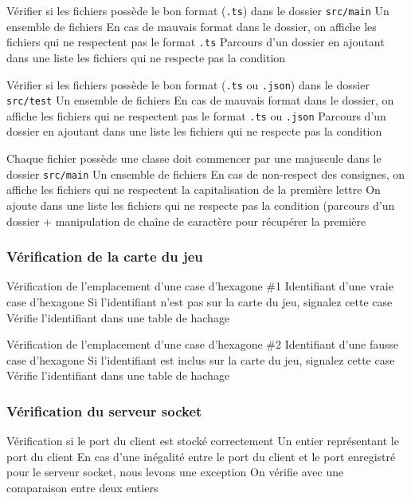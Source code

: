 \mytest
{Vérifier si les fichiers possède le bon format (\texttt{.ts}) dans le dossier \texttt{src/main}}
{Un ensemble de fichiers}
{En cas de mauvais format dans le dossier, on affiche les fichiers qui ne respectent pas le format \texttt{.ts}}
{Parcours d'un dossier en ajoutant dans une liste les fichiers qui ne respecte pas la condition}

\mytest
{Vérifier si les fichiers possède le bon format (\texttt{.ts} ou \texttt{.json}) dans le dossier \texttt{src/test}}
{Un ensemble de fichiers}
{En cas de mauvais format dans le dossier, on affiche les fichiers qui ne respectent pas le format \texttt{.ts} ou \texttt{.json}}
{Parcours d'un dossier en ajoutant dans une liste les fichiers qui ne respecte pas la condition}

\mytest
{Chaque fichier possède une classe doit commencer par une majuscule dans le dossier \texttt{src/main}}
{Un ensemble de fichiers}
{En cas de non-respect des consignes, on affiche les fichiers qui ne respectent la capitalisation de la première lettre}
{On ajoute dans une liste les fichiers qui ne respecte pas la condition (parcours d'un dossier + manipulation de chaîne de caractère pour récupérer la première}

\subsubsection{Vérification de la carte du jeu}

\mytest
{Vérification de l'emplacement d'une case d'hexagone \#1}
{Identifiant d'une vraie case d'hexagone}
{Si l'identifiant n'est pas sur la carte du jeu, signalez cette case}
{Vérifie l'identifiant dans une table de hachage}

\mytest
{Vérification de l'emplacement d'une case d'hexagone \#2}
{Identifiant d'une fausse case d'hexagone}
{Si l'identifiant est inclus sur la carte du jeu, signalez cette case}
{Vérifie l'identifiant dans une table de hachage}

\subsubsection{Vérification du serveur socket}

\mytest
{Vérification si le port du client est stocké correctement}
{Un entier représentant le port du client}
{En cas d'une inégalité entre le port du client et le port enregistré pour le serveur socket, nous levons une exception}
{On vérifie avec une comparaison entre deux entiers}

